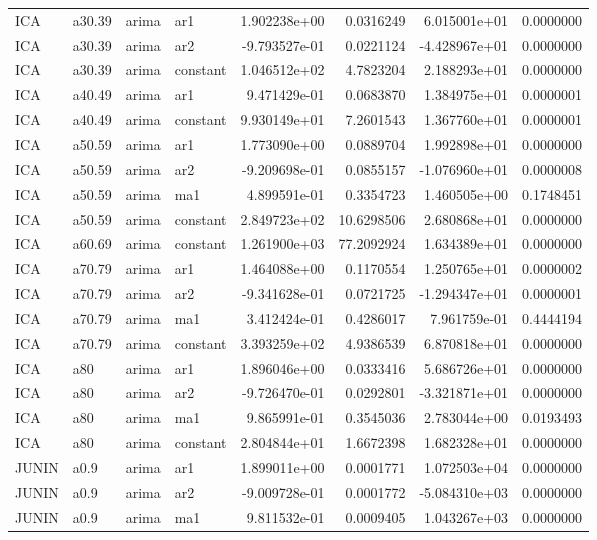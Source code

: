 \documentclass[
]{article}
\begin{document}
\begin{table}[!h]
\begin{tabular}[t]{llllrrrr}
ICA & a30.39 & arima & ar1 & 1.902238e+00 & 0.0316249 & 6.015001e+01 & 0.0000000\\
ICA & a30.39 & arima & ar2 & -9.793527e-01 & 0.0221124 & -4.428967e+01 & 0.0000000\\
\addlinespace
ICA & a30.39 & arima & constant & 1.046512e+02 & 4.7823204 & 2.188293e+01 & 0.0000000\\
ICA & a40.49 & arima & ar1 & 9.471429e-01 & 0.0683870 & 1.384975e+01 & 0.0000001\\
ICA & a40.49 & arima & constant & 9.930149e+01 & 7.2601543 & 1.367760e+01 & 0.0000001\\
ICA & a50.59 & arima & ar1 & 1.773090e+00 & 0.0889704 & 1.992898e+01 & 0.0000000\\
ICA & a50.59 & arima & ar2 & -9.209698e-01 & 0.0855157 & -1.076960e+01 & 0.0000008\\
\addlinespace
ICA & a50.59 & arima & ma1 & 4.899591e-01 & 0.3354723 & 1.460505e+00 & 0.1748451\\
ICA & a50.59 & arima & constant & 2.849723e+02 & 10.6298506 & 2.680868e+01 & 0.0000000\\
ICA & a60.69 & arima & constant & 1.261900e+03 & 77.2092924 & 1.634389e+01 & 0.0000000\\
ICA & a70.79 & arima & ar1 & 1.464088e+00 & 0.1170554 & 1.250765e+01 & 0.0000002\\
ICA & a70.79 & arima & ar2 & -9.341628e-01 & 0.0721725 & -1.294347e+01 & 0.0000001\\
\addlinespace
ICA & a70.79 & arima & ma1 & 3.412424e-01 & 0.4286017 & 7.961759e-01 & 0.4444194\\
ICA & a70.79 & arima & constant & 3.393259e+02 & 4.9386539 & 6.870818e+01 & 0.0000000\\
ICA & a80 & arima & ar1 & 1.896046e+00 & 0.0333416 & 5.686726e+01 & 0.0000000\\
ICA & a80 & arima & ar2 & -9.726470e-01 & 0.0292801 & -3.321871e+01 & 0.0000000\\
ICA & a80 & arima & ma1 & 9.865991e-01 & 0.3545036 & 2.783044e+00 & 0.0193493\\
\addlinespace
ICA & a80 & arima & constant & 2.804844e+01 & 1.6672398 & 1.682328e+01 & 0.0000000\\
JUNIN & a0.9 & arima & ar1 & 1.899011e+00 & 0.0001771 & 1.072503e+04 & 0.0000000\\
JUNIN & a0.9 & arima & ar2 & -9.009728e-01 & 0.0001772 & -5.084310e+03 & 0.0000000\\
JUNIN & a0.9 & arima & ma1 & 9.811532e-01 & 0.0009405 & 1.043267e+03 & 0.0000000\\

\end{tabular}
\end{table}
\end{document}
